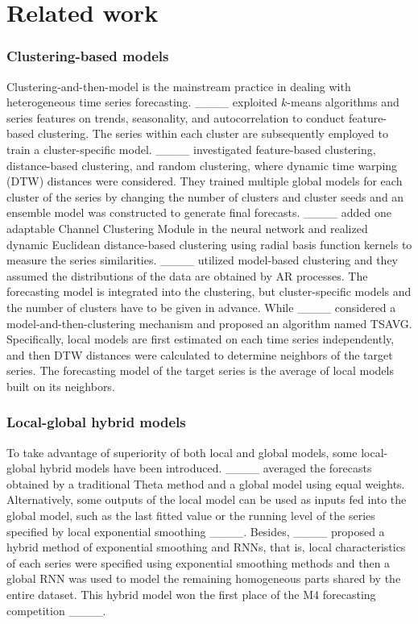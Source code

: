\section{Related work}
\subsubsection{Clustering-based models}
    Clustering-and-then-model is the mainstream practice in dealing with heterogeneous time series forecasting. ____ exploited $k$-means algorithms and series features on trends, seasonality, and autocorrelation to conduct feature-based clustering. The series within each cluster are subsequently employed to train a cluster-specific model. ____ investigated feature-based clustering, distance-based clustering, and random clustering, where dynamic time warping (DTW) distances were considered. They trained multiple global models for each cluster of the series by changing the number of clusters and cluster seeds and an ensemble model was constructed to generate final forecasts. ____ added one adaptable Channel Clustering Module in the neural network and realized dynamic Euclidean distance-based clustering using radial basis function kernels to measure the series similarities. ____ utilized model-based clustering and they assumed the distributions of the data are obtained by AR processes. The forecasting model is integrated into the clustering, but cluster-specific models and the number of clusters have to be given in advance. While ____ considered a model-and-then-clustering mechanism and proposed an algorithm named TSAVG. Specifically, local models are first estimated on each time series independently, and then DTW distances were calculated to determine neighbors of the target series. The forecasting model of the target series is the average of local models built on its neighbors.
    
    \subsubsection{Local-global hybrid models}
    To take advantage of superiority of both local and global models, some local-global hybrid models have been introduced. ____ averaged the forecasts obtained by a traditional Theta method and a global model using equal weights. Alternatively, some outputs of the local model can be used as inputs fed into the global model, such as the last fitted value or the running level of the series specified by local exponential smoothing ____. Besides, ____ proposed a hybrid method of exponential smoothing and RNNs, that is, local characteristics of each series were specified using exponential smoothing methods and then a global RNN was used to model the remaining homogeneous parts shared by the entire dataset. This hybrid model won the first place of the M4 forecasting competition ____.
    
